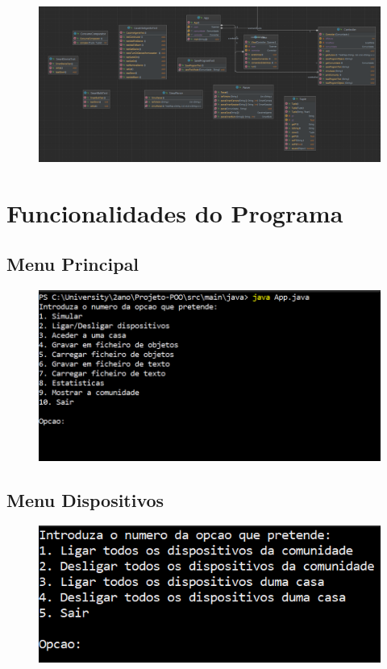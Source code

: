 \documentclass[11pt,a4paper]{report}
\begin{document}
	\begin{figure}[H]
        \includegraphics[scale=0.3]{diagrama intellij2.png}
	\end{figure}
	
	     
    
    
\pagebreak	
    \chapter{Funcionalidades do Programa}
    \section{Menu Principal}
    \begin{figure}[H]
        \includegraphics[scale=0.5]{menu1.png}
	\end{figure}
	
	\section{Menu Dispositivos}
	\begin{figure}[H]
        \includegraphics[scale=0.8]{menu2.png}
	\end{figure}
	
\end{document}
